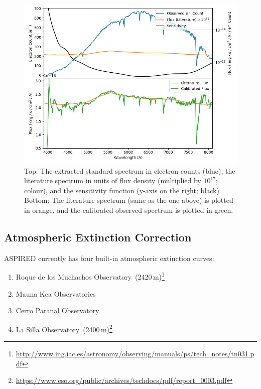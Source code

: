 \documentclass[fleqn,usenatbib]{mnras}
\begin{document}
\begin{figure}
    \centering
    \includegraphics[width=\columnwidth]{fig_06_flux_calibration_diagnostics.jpg}
    \caption{Top: The extracted standard spectrum in electron counts
    (blue), the literature spectrum in units of flux density (multiplied
    by $10^{17}$; colour), and the sensitivity function (y-axis on the right; black).
    Bottom: The literature spectrum (same as the one above) is plotted
    in orange, and the calibrated observed spectrum is plotted in green.}
    \label{fig:fluxcal}
\end{figure}

\subsection{Atmospheric Extinction Correction}
\textsc{ASPIRED} currently has four built-in atmospheric extinction curves:

\begin{enumerate}
    \item Roque de los Muchachos Observatory~(2420\,m)\footnote{\url{http://www.ing.iac.es/astronomy/observing/manuals/ps/tech\_notes/tn031.pdf}}
    \item Mauna Kea Observatories~\citep[4205\,m;][]{2013A&A...549A...8B}
    \item Cerro Paranal Observatory~\citep[2635\,m;][]{2011A&A...527A..91P}
    \item La Silla Observatory~(2400\,m)\footnote{\url{https://www.eso.org/public/archives/techdocs/pdf/report\_0003.pdf}}
\end{enumerate}
\end{document}
